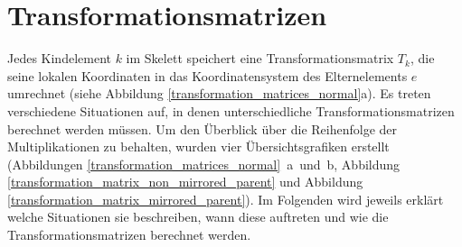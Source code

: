 \section{Transformationsmatrizen}
\label{implementation_detail_matrices}


Jedes Kindelement $k$ im Skelett speichert eine Transformationsmatrix $T_k$, die seine lokalen Koordinaten in das Koordinatensystem des Elternelements $e$ umrechnet (siehe Abbildung \ref{transformation_matrices_normal}a).
Es treten verschiedene Situationen auf, in denen unterschiedliche Transformationsmatrizen berechnet werden müssen.
Um den Überblick über die Reihenfolge der Multiplikationen zu behalten, wurden vier Übersichtsgrafiken erstellt (Abbildungen \mbox{\ref{transformation_matrices_normal} a und b}, Abbildung \ref{transformation_matrix_non_mirrored_parent} und Abbildung \ref{transformation_matrix_mirrored_parent}). Im Folgenden wird jeweils erklärt welche Situationen sie beschreiben, wann diese auftreten und wie die Transformationsmatrizen berechnet werden.

